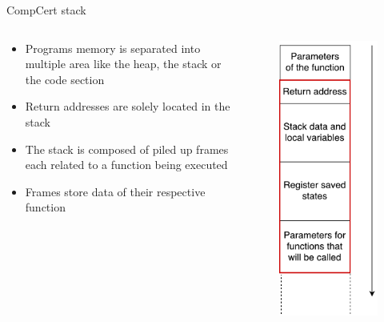\documentclass{beamer}
\begin{document}
\begin{frame}[c]{CompCert stack}
	\begin{columns}
		\begin{column}{0.55\textwidth}
			\begin{itemize}
				\item Programs memory is separated into multiple area like the heap, the stack or the code section
				\item Return addresses are solely located in the stack
				\item The stack is composed of piled up frames each related to a function being executed
				\item Frames store data of their respective function
			\end{itemize}
		\end{column}
		\begin{column}{0.45\textwidth}
			\begin{figure}
			\centering
			\includegraphics[height=0.75\textheight]{images/stack_layout.pdf}

\end{figure}
\end{column}
\end{columns}
\end{frame}
\end{document}
